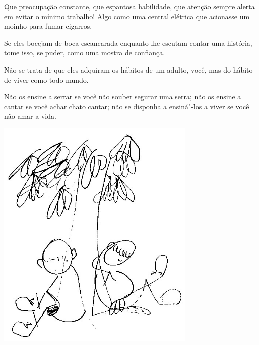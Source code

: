 \bigskip
\bigskip

Que preocupação constante, que espantosa habilidade, que atenção sempre
alerta em evitar o mínimo trabalho! Algo como uma central elétrica que
acionasse um moinho para fumar cigarros.

\bigskip
\bigskip

Se eles bocejam de boca escancarada enquanto lhe escutam contar uma
história, tome isso, se puder, como uma mostra de confiança.

\bigskip
\bigskip

Não se trata de que eles adquiram os hábitos de um adulto, você, mas do
hábito de viver como todo mundo.

\bigskip
\bigskip

Não os ensine a serrar se você não souber segurar uma serra; não os
ensine a cantar se você achar chato cantar; não se disponha a ensiná"-los
a viver se você não amar a vida.

\bigskip
\bigskip


\pagebreak
\thispagestyle{empty}

\begin{vplace}[.50]
\begin{center}
\includegraphics[width=95mm]{./imgs/Image_8.jpg}
\end{center}
\end{vplace}

